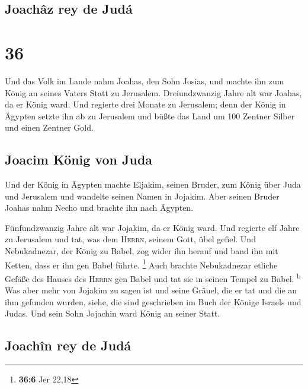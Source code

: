 \hypertarget{joachuxe2z-rey-de-juduxe1}{%
\subsection{Joachâz rey de Judá}\label{joachuxe2z-rey-de-juduxe1}}

\hypertarget{section-35}{%
\section{36}\label{section-35}}

 Und das Volk im Lande nahm Joahas, den Sohn Josias, und
machte ihn zum König an seines Vaters Statt zu Jerusalem. 
Dreiundzwanzig Jahre alt war Joahas, da er König ward. Und regierte drei
Monate zu Jerusalem;  denn der König in Ägypten setzte ihn
ab zu Jerusalem und büßte das Land um 100 Zentner Silber und einen
Zentner Gold.

\hypertarget{joacim-kuxf6nig-von-juda}{%
\subsection{Joacim König von Juda}\label{joacim-kuxf6nig-von-juda}}

 Und der König in Ägypten machte Eljakim, seinen Bruder,
zum König über Juda und Jerusalem und wandelte seinen Namen in Jojakim.
Aber seinen Bruder Joahas nahm Necho und brachte ihn nach Ägypten.

 Fünfundzwanzig Jahre alt war Jojakim, da er König ward.
Und regierte elf Jahre zu Jerusalem und tat, was dem \textsc{Herrn},
seinem Gott, übel gefiel.  Und Nebukadnezar, der König zu
Babel, zog wider ihn herauf und band ihn mit Ketten, dass er ihn gen
Babel führte. \footnote{\textbf{36:6} Jer 22,18}  Auch
brachte Nebukadnezar etliche Gefäße des Hauses des \textsc{Herrn} gen
Babel und tat sie in seinen Tempel zu Babel. \textsuperscript{b}
 Was aber mehr von Jojakim zu sagen ist und seine Gräuel,
die er tat und die an ihm gefunden wurden, siehe, die sind geschrieben
im Buch der Könige Israels und Judas. Und sein Sohn Jojachin ward König
an seiner Statt.

\hypertarget{joachuxeen-rey-de-juduxe1}{%
\subsection{Joachîn rey de Judá}\label{joachuxeen-rey-de-juduxe1}}

